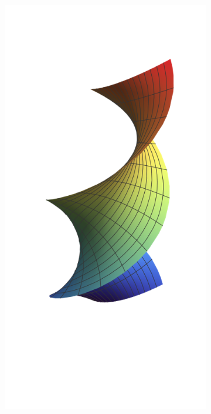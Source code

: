 \documentclass[spanish]{book}
\theoremstyle{definition}
\begin{document}
\begin{figure}[H]
\begin{subfigure}{.125\textwidth}
			\includegraphics[width=\linewidth]{sup13}
		\end{subfigure}
		\begin{subfigure}{0.125\textwidth}
			\centering

\end{subfigure}
\end{figure}
\end{document}
